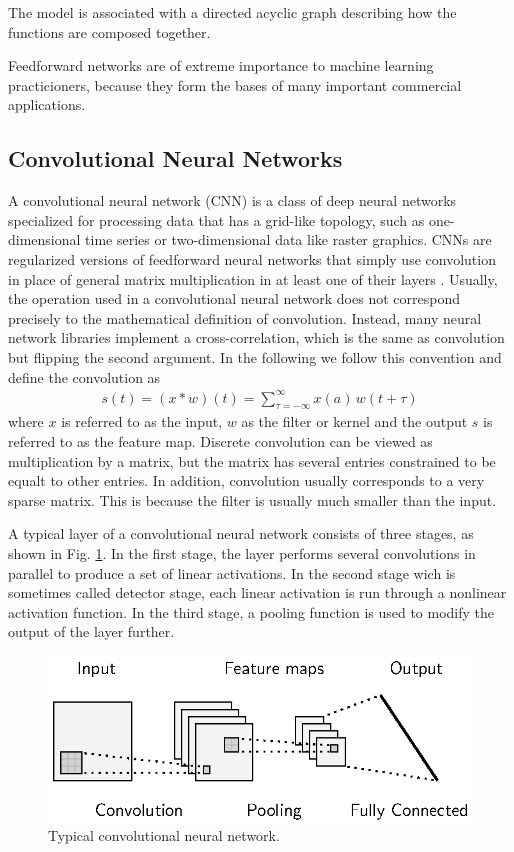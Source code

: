 \documentclass{scrartcl}
\begin{document}
The model is associated with a directed acyclic graph describing how the functions are composed together.

Feedforward networks are of extreme importance to machine learning practicioners, because they form the bases of many important commercial applications. 


\subsection{Convolutional Neural Networks}

A convolutional neural network (CNN) \cite{LeCun1989} is a class of deep neural networks specialized for processing data that has a grid-like topology, such as one-dimensional time series or two-dimensional data like raster graphics. CNNs are regularized versions of feedforward neural networks that simply use convolution in place of general matrix multiplication in at least one of their layers \cite{Goodfellow2016}. Usually, the operation used in a convolutional neural network does not correspond precisely to the mathematical definition of convolution. Instead, many neural network libraries implement a cross-correlation, which is the same as convolution but flipping the second argument. In the following we follow this convention and define the convolution as
\begin{align}
s(t) = (x * w)(t) = \sum_{\tau=-\infty}^{\infty} x(a)\,w(t+\tau)
\end{align} 
where $x$ is referred to as the input, $w$ as the filter or kernel and the output $s$ is referred to as the feature map. Discrete convolution can be viewed as multiplication by a matrix, but the matrix has several entries constrained to be equalt to other entries. In addition, convolution usually corresponds to a very sparse matrix. This is because the filter is usually much smaller than the input. 

A typical layer of a convolutional neural network consists of three stages, as shown in Fig. \ref{fig:typical_cnn}. In the first stage, the layer performs several convolutions in parallel to produce a set of linear activations. In the second stage wich is sometimes called detector stage, each linear activation is run through a nonlinear activation function. In the third stage, a pooling function is used to modify the output of the layer further. 

\begin{figure}[htbp]
\centering
\includegraphics[scale=1]{figures/cnn.eps}
\caption{Typical convolutional neural network. }
\label{fig:typical_cnn}
\end{figure}
\end{document}
